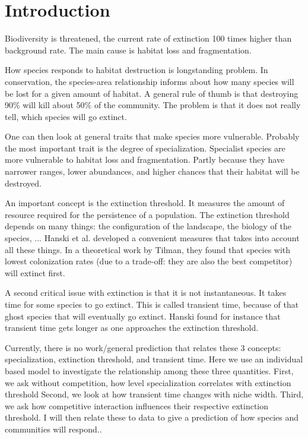 \section{Introduction}
\label{sec:Introduction}

Biodiversity is threatened, the current rate of extinction 100 times higher than background rate.
The main cause is habitat loss and fragmentation.


How species responds to habitat destruction is longstanding problem.
In conservation, the species-area relationship informs about how many species will be lost for a given amount of habitat.
A general rule of thumb is that destroying 90\% will kill about 50\% of the community.
The problem is that it does not really tell, which species will go extinct.

One can then look at general traits that make species more vulnerable.
Probably the most important trait is the degree of specialization.
Specialist species are more vulnerable to habitat loss and fragmentation.
Partly because they have narrower ranges, lower abundances, and higher chances that their habitat will be destroyed.

An important concept is the extinction threshold.
It measures the amount of resource required for the persistence of a population.
The extinction threshold depends on many things: the configuration of the landscape, the biology of the species, ...
Hanski et al. developed a convenient measures that takes into account all these things.
In a theoretical work by Tilman, they found that species with lowest colonization rates (due to a trade-off: they are also the best competitor) will
extinct first.

A second critical issue with extinction is that it is not instantaneous.
It takes time for some species to go extinct.
This is called transient time, because of that ghost species that will eventually go extinct.
Hanski found for instance that transient time gets longer as one approaches the extinction threshold.


Currently, there is no work/general prediction that relates these 3 concepts: specialization, extinction threshold, and transient time.
Here we use an individual based model to investigate the relationship among these three quantities.
First, we ask without competition, how level specialization correlates with extinction threshold
Second, we look at how transient time changes with niche width.
Third, we ask how competitive interaction influences their respective extinction threshold.
I will then relate these to data to give a prediction of how species and communities will respond..

